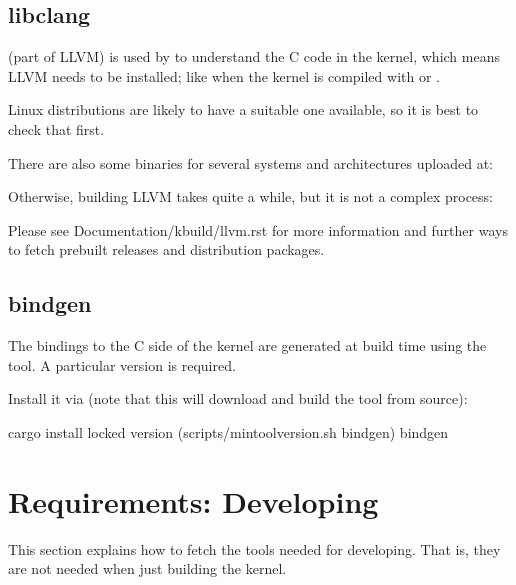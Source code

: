 \documentclass[a4paper,11pt,english]{sphinxmanual}
\begin{document}
\subsection{libclang}
\label{\detokenize{quick-start:libclang}}
 (part of LLVM) is used by  to understand the C code
in the kernel, which means LLVM needs to be installed; like when the kernel
is compiled with  or .

Linux distributions are likely to have a suitable one available, so it is
best to check that first.

There are also some binaries for several systems and architectures uploaded at:
\begin{quote}

\end{quote}

Otherwise, building LLVM takes quite a while, but it is not a complex process:
\begin{quote}

\end{quote}

Please see Documentation/kbuild/llvm.rst for more information and further ways
to fetch pre\sphinxhyphen{}built releases and distribution packages.


\subsection{bindgen}
\label{\detokenize{quick-start:bindgen}}
The bindings to the C side of the kernel are generated at build time using
the  tool. A particular version is required.

Install it via (note that this will download and build the tool from source):

\begin{sphinxVerbatim}[commandchars=\\\{\}]
cargo install \PYGZhy{}\PYGZhy{}locked \PYGZhy{}\PYGZhy{}version \PYGZdl{}(scripts/min\PYGZhy{}tool\PYGZhy{}version.sh bindgen) bindgen
\end{sphinxVerbatim}


\section{Requirements: Developing}
\label{\detokenize{quick-start:requirements-developing}}
This section explains how to fetch the tools needed for developing. That is,
they are not needed when just building the kernel.
\end{document}
